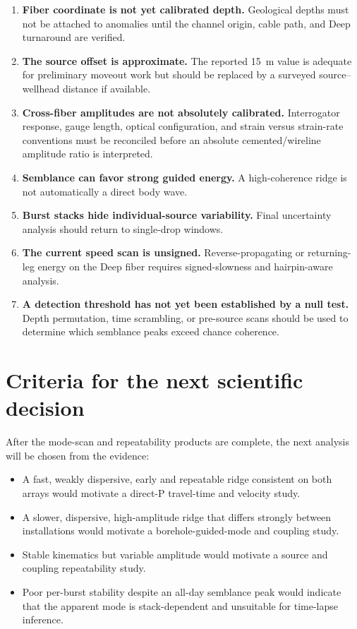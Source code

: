\documentclass[11pt]{article}
\begin{document}
\begin{enumerate}
    \item \textbf{Fiber coordinate is not yet calibrated depth.} Geological
          depths must not be attached to anomalies until the channel origin,
          cable path, and Deep turnaround are verified.
    \item \textbf{The source offset is approximate.} The reported 15~m value is
          adequate for preliminary moveout work but should be replaced by a
          surveyed source--wellhead distance if available.
    \item \textbf{Cross-fiber amplitudes are not absolutely calibrated.}
          Interrogator response, gauge length, optical configuration, and
          strain versus strain-rate conventions must be reconciled before an
          absolute cemented/wireline amplitude ratio is interpreted.
    \item \textbf{Semblance can favor strong guided energy.} A high-coherence
          ridge is not automatically a direct body wave.
    \item \textbf{Burst stacks hide individual-source variability.} Final
          uncertainty analysis should return to single-drop windows.
    \item \textbf{The current speed scan is unsigned.} Reverse-propagating or
          returning-leg energy on the Deep fiber requires signed-slowness and
          hairpin-aware analysis.
    \item \textbf{A detection threshold has not yet been established by a
          null test.} Depth permutation, time scrambling, or pre-source scans
          should be used to determine which semblance peaks exceed chance
          coherence.
\end{enumerate}

\section{Criteria for the next scientific decision}

After the mode-scan and repeatability products are complete, the next analysis
will be chosen from the evidence:

\begin{itemize}
    \item A fast, weakly dispersive, early and repeatable ridge consistent on
          both arrays would motivate a direct-P travel-time and velocity study.
    \item A slower, dispersive, high-amplitude ridge that differs strongly
          between installations would motivate a borehole-guided-mode and
          coupling study.
    \item Stable kinematics but variable amplitude would motivate a source and
          coupling repeatability study.
    \item Poor per-burst stability despite an all-day semblance peak would
          indicate that the apparent mode is stack-dependent and unsuitable
          for time-lapse inference.
\end{itemize}
\end{document}
